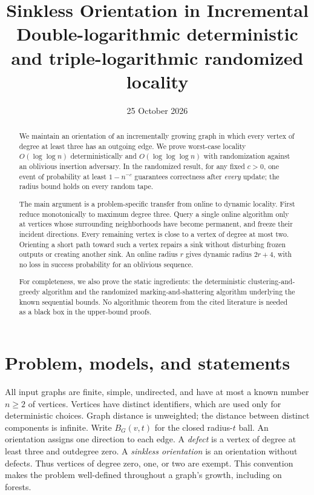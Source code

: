 \documentclass[11pt]{article}
\title{Sinkless Orientation in Incremental \Dyn\\[3pt]
  \large Double-logarithmic deterministic and triple-logarithmic randomized locality}
\author{}
\date{25 October 2026}
\theoremstyle{definition}
\begin{document}
\maketitle

\begin{abstract}
We maintain an orientation of an incrementally growing graph in which every
vertex of degree at least three has an outgoing edge. We prove worst-case
locality $O(\log\log n)$ deterministically and
$O(\log\log\log n)$ with randomization against an oblivious insertion
adversary. In the randomized result, for any fixed $c>0$, one event of
probability at least $1-n^{-c}$ guarantees correctness after \emph{every}
update; the radius bound holds on every random tape.

The main argument is a problem-specific transfer from online to dynamic
locality. First reduce monotonically to maximum degree three. Query a single
online algorithm only at vertices whose surrounding neighborhoods have
become permanent, and freeze their incident directions. Every remaining
vertex is close to a vertex of degree at most two. Orienting a short path
toward such a vertex repairs a sink without disturbing frozen outputs or
creating another sink. An online radius $r$ gives dynamic radius $2r+4$,
with no loss in success probability for an oblivious sequence.

For completeness, we also prove the static ingredients: the deterministic
clustering-and-greedy algorithm and the randomized marking-and-shattering
algorithm underlying the known sequential bounds. No algorithmic theorem
from the cited literature is needed as a black box in the upper-bound proofs.
\end{abstract}

\tableofcontents
\clearpage

\section{Problem, models, and statements}\label{sec:model}

All input graphs are finite, simple, undirected, and have at most a known
number $n\ge2$ of vertices. Vertices have distinct identifiers, which are
used only for deterministic choices. Graph distance is unweighted; the
distance between distinct components is infinite. Write $B_G(v,t)$ for the
closed radius-$t$ ball. An orientation assigns one direction to each edge.
A \emph{defect} is a vertex of degree at least three and outdegree zero.
A \emph{sinkless orientation} is an orientation without defects. Thus
vertices of degree zero, one, or two are exempt. This convention makes the
problem well-defined throughout a graph's growth, including on forests.
\end{document}
